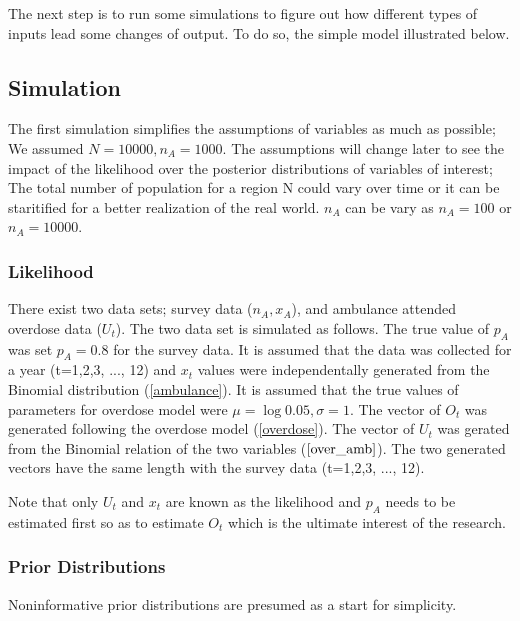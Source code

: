 \documentclass[
10pt, %
letterpaper, %
oneside, %
headinclude,footinclude, %
BCOR5mm, %
]{article}
\begin{document}
The next step is to run some simulations to figure out how different types of inputs lead some changes of output. To do so, the simple model illustrated below.\\

\subsection{Simulation}

\normalsize 
The first simulation simplifies the assumptions of variables as much as possible; We assumed $N= 10000, n_{A}=1000$. The assumptions will change later to see the impact of the likelihood over the posterior distributions of variables of interest; The total number of population for a region N could vary over time or it can be staritified for a better realization of the real world. $n_A$ can be vary as $n_{A}=100$ or $n_{A}=10000$.  \\

\subsubsection{Likelihood}

\normalsize 
There exist two data sets; survey data ($n_A, x_A$), and ambulance attended overdose data ($U_t$). The two data set is simulated as follows.
The true value of $p_A$ was set $p_A=0.8$ for the survey data.
It is assumed that the data was collected for a year (t=1,2,3, ..., 12) and 
$x_t$ values were independentally generated from the Binomial distribution (\ref{ambulance}). It is assumed that the true values of parameters for overdose model were $\mu=\log0.05, \sigma=1$.
The vector of $O_t$ was generated following the overdose model (\ref{overdose}). The vector of $U_t$ was gerated from the Binomial relation of the two variables ($\ref{over_amb}$). The two generated vectors have the same length with the survey data (t=1,2,3, ..., 12).

Note that only $U_t$ and $x_t$ are known as the likelihood and $p_A$ needs to be estimated first so as to estimate $O_t$ which is the ultimate interest of the research.\\


\subsubsection{Prior Distributions}
\normalsize Noninformative prior distributions are presumed as a start for simplicity. 
\end{document}
